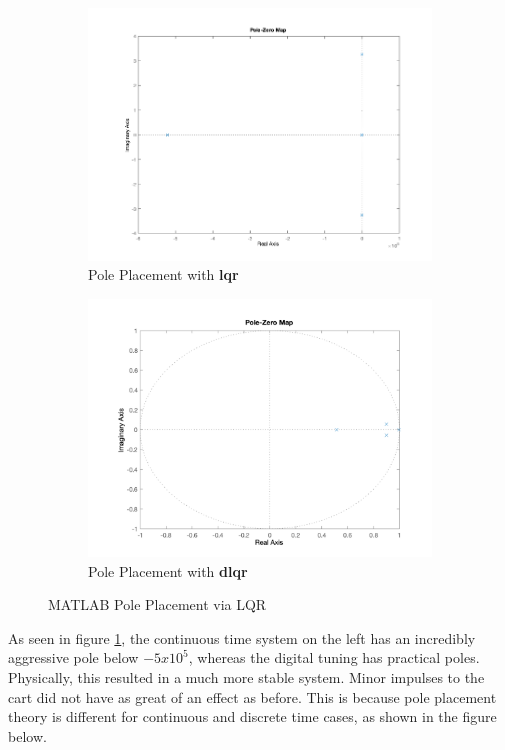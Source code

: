\documentclass[12pt]{article}
\begin{document}
\begin{figure}[H]
    \centering
    \begin{subfigure}{.49\textwidth}
      \centering
      \includegraphics[width=1\linewidth]{figures/pzBigLQR.png}
      \caption{Pole Placement with \textbf{lqr}}
    \end{subfigure}
    \begin{subfigure}{.49\textwidth}
      \centering
      \includegraphics[width=1\linewidth]{figures/dlqrPoles.png}
      \caption{Pole Placement with \textbf{dlqr}}
    \end{subfigure}
    \caption{MATLAB Pole Placement via LQR}
    \label{fig:lqrPoles}
\end{figure}
As seen in figure \ref{fig:lqrPoles}, the continuous time system on the left has an incredibly aggressive pole below $-5x10^5$, whereas the digital tuning has practical poles. Physically, this resulted in a much more stable system. Minor impulses to the cart did not have as great of an effect as before. This is because pole placement theory is different for continuous and discrete time cases, as shown in the figure below.
\end{document}

